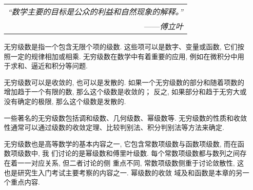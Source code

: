 \begin{flushright}
    \begin{tabular}{r|}
        \textit{“数学主要的目标是公众的利益和自然现象的解释。”}\\
        ——\textit{傅立叶}
    \end{tabular}
\end{flushright}

无穷级数是指一个包含无限个项的级数. 这些项可以是数字、变量或函数, 它们按照一定的规律相加或相乘. 
无穷级数在数学中有着重要的应用, 例如在微积分中用于求和、逼近和积分等问题. 

无穷级数可以是收敛的, 也可以是发散的. 如果一个无穷级数的部分和随着项数的增加趋于一个有限的数, 那么这个级数是收敛的；
反之, 如果部分和趋于无穷大或没有确定的极限, 那么这个级数是发散的. 

一些著名的无穷级数包括调和级数、几何级数、幂级数等. 无穷级数的性质和收敛性通常可以通过级数的收敛定理、比较判别法、积分判别法等方法来确定. 

无穷级数也是高等数学的基本内容之一, 它包含常数项级数与函数项级数, 而在函数项级数中, 我
们讨论的是幂级数和傅里叶级数. 每个常数项级数都与数列之间存在着一一对应关系, 但二者讨论的侧
重点不同, 常数项级数侧重于讨论敛散性, 这也是研究生入门考试主要考察的内容之一. 幂级数的收敛
域及和函数是本章的另一个重点内容.